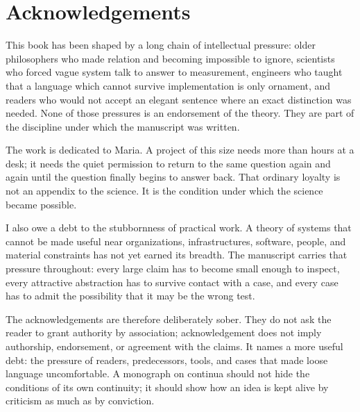 \documentclass[11pt,a4paper,openany]{book}
\begin{document}
\section*{Acknowledgements}
This book has been shaped by a long chain of intellectual pressure: older philosophers who made relation and becoming impossible to ignore, scientists who forced vague system talk to answer to measurement, engineers who taught that a language which cannot survive implementation is only ornament, and readers who would not accept an elegant sentence where an exact distinction was needed. None of those pressures is an endorsement of the theory. They are part of the discipline under which the manuscript was written.\par
The work is dedicated to Maria. A project of this size needs more than hours at a desk; it needs the quiet permission to return to the same question again and again until the question finally begins to answer back. That ordinary loyalty is not an appendix to the science. It is the condition under which the science became possible.\par
I also owe a debt to the stubbornness of practical work. A theory of systems that cannot be made useful near organizations, infrastructures, software, people, and material constraints has not yet earned its breadth. The manuscript carries that pressure throughout: every large claim has to become small enough to inspect, every attractive abstraction has to survive contact with a case, and every case has to admit the possibility that it may be the wrong test.\par
The acknowledgements are therefore deliberately sober. They do not ask the reader to grant authority by association; acknowledgement does not imply authorship, endorsement, or agreement with the claims. It names a more useful debt: the pressure of readers, predecessors, tools, and cases that made loose language uncomfortable. A monograph on continua should not hide the conditions of its own continuity; it should show how an idea is kept alive by criticism as much as by conviction.\par
\end{document}
